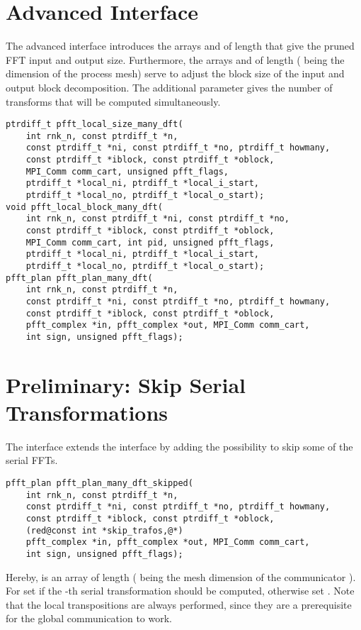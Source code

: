 \section{Advanced Interface}
The advanced interface introduces the arrays  and  of length 
that give the pruned FFT input and output size.
Furthermore, the arrays  and  of length  ( being the dimension of the process mesh)
serve to adjust the block size of the input and output block decomposition.
The additional parameter  gives the number of transforms that will be computed simultaneously.
\begin{lstlisting}
ptrdiff_t pfft_local_size_many_dft(
    int rnk_n, const ptrdiff_t *n,
    const ptrdiff_t *ni, const ptrdiff_t *no, ptrdiff_t howmany,
    const ptrdiff_t *iblock, const ptrdiff_t *oblock,
    MPI_Comm comm_cart, unsigned pfft_flags,
    ptrdiff_t *local_ni, ptrdiff_t *local_i_start,
    ptrdiff_t *local_no, ptrdiff_t *local_o_start);
void pfft_local_block_many_dft(
    int rnk_n, const ptrdiff_t *ni, const ptrdiff_t *no,
    const ptrdiff_t *iblock, const ptrdiff_t *oblock,
    MPI_Comm comm_cart, int pid, unsigned pfft_flags,
    ptrdiff_t *local_ni, ptrdiff_t *local_i_start,
    ptrdiff_t *local_no, ptrdiff_t *local_o_start);
pfft_plan pfft_plan_many_dft(
    int rnk_n, const ptrdiff_t *n,
    const ptrdiff_t *ni, const ptrdiff_t *no, ptrdiff_t howmany,
    const ptrdiff_t *iblock, const ptrdiff_t *oblock,
    pfft_complex *in, pfft_complex *out, MPI_Comm comm_cart,
    int sign, unsigned pfft_flags);
\end{lstlisting}


\section{Preliminary: Skip Serial Transformations}
The  interface extends the  interface by adding the possibility to skip some of the serial FFTs.
\begin{lstlisting}
pfft_plan pfft_plan_many_dft_skipped(
    int rnk_n, const ptrdiff_t *n,
    const ptrdiff_t *ni, const ptrdiff_t *no, ptrdiff_t howmany,
    const ptrdiff_t *iblock, const ptrdiff_t *oblock,
    (red@const int *skip_trafos,@*)
    pfft_complex *in, pfft_complex *out, MPI_Comm comm_cart,
    int sign, unsigned pfft_flags);
\end{lstlisting}
Hereby,  is an  array of length  ( being the mesh dimension of the communicator ).
For  set  if the -th serial transformation should be computed, otherwise set .
Note that the local transpositions are always performed, since they are a prerequisite for the global communication to work.
